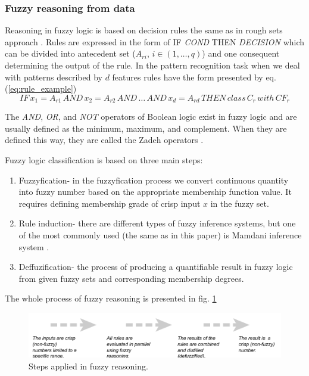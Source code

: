 \subsubsection{Fuzzy reasoning from data}
Reasoning in fuzzy logic is based on decision rules the same as in rough sets
approach \cite{bib11}. 
Rules are expressed in the form of IF \textit{COND} THEN \textit{DECISION} 
which can be divided into antecedent set ($A_{ri}, \, i \in (1, \ldots, q)$) and one consequent determining the
output of the rule. In the pattern recognition task when we deal with patterns
described by $d$ features rules have the form presented by eq. (\ref{eq:rule_example})
\begin{equation}
    IF\, x_1=A_{r1}\, AND\, x_2=A_{r2}\, AND\, \ldots\, AND\, x_d=A_{rd}\, THEN\,
class\, C_r\, with \, CF_r
    \label{eq:rule_example}
\end{equation}

The \textit{AND}, \textit{OR}, and \textit{NOT} operators of 
Boolean logic exist in fuzzy logic and are usually defined as the minimum, maximum,
and complement. When they are defined this way, they are called the Zadeh
operators \cite{bib2}.

Fuzzy logic classification is based on three main steps:
\begin{enumerate}
    \item Fuzzyfication- in the fuzzyfication process we 
        convert continuous quantity into fuzzy number based on the appropriate
        membership function value. It requires defining
        membership grade of crisp input $x$ in the fuzzy set.
    \item Rule induction- there are different types of fuzzy inference systems,
        but one of the most commonly used (the same as in this paper) is
        Mamdani inference system \cite{bib46}.
    \item Deffuzification- the process of producing a quantifiable result in
        fuzzy logic from given fuzzy sets and corresponding membership degrees. 
\end{enumerate}
The whole process of fuzzy reasoning is presented in fig.
\ref{fig:fuzzy_reasoning}
\begin{figure}[H]
    \begin{center}
        \includegraphics[width=\textwidth]{fig/fuzzy_steps.png}
    \end{center}
    \caption{Steps applied in fuzzy reasoning.}
    \label{fig:fuzzy_reasoning}
\end{figure}

